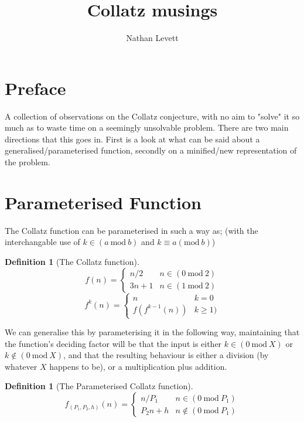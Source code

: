 \documentclass[12pt,a4paper]{amsart}
\author{Nathan Levett}
\title{Collatz musings}
\numberwithin{equation}{section}
\theoremstyle{plain}
\theoremstyle{definition}
\newtheorem{Def}[Th]{Definition}
\begin{document}
	
\tableofcontents

\section{Preface}

A collection of observations on the Collatz conjecture, with no aim to "solve" it so much as to waste time on a seemingly unsolvable problem. There are two main directions that this goes in. First is a look at what can be said about a generalised/parameterised function, secondly on a minified/new representation of the problem.

\section{Parameterised Function}

The Collatz function can be parameterised in such a way as; (with the interchangable use of $k \in \left ( a\:\mathrm{mod}\:b \right )$ and $k \equiv a \left ( \mathrm{mod}\:b \right )$) 

\begin{Def}[The Collatz function]
\begin{equation}
f\left ( n \right )=\left\{\begin{matrix}
n/2  & n \in \left ( 0\:\mathrm{mod}\:2 \right ) \\ 
3n+1 & n \in \left ( 1\:\mathrm{mod}\:2 \right )
\end{matrix}\right.
\end{equation}
\begin{equation}
f^{k}\left ( n \right )=\left\{\begin{matrix}
n & k=0 \\ 
f\left ( f^{k-1}\left ( n \right ) \right ) & k \geq 1 )
\end{matrix}\right.
\end{equation}
\end{Def}

We can generalise this by parameterising it in the following way, maintaining that the function's deciding factor will be that the input is either $k \in \left ( 0\:\mathrm{mod}\:X \right )$ or $k \notin \left ( 0\:\mathrm{mod}\:X \right )$, and that the resulting behaviour is either a division (by whatever $X$ happens to be), or a multiplication plus addition.

\begin{Def}[The Parameterised Collatz function]
\begin{equation}
f_{\left (P_{1},P_{2},h\right )}\left ( n \right )=\left\{\begin{matrix}
n/P_{1}  & n \in \left ( 0\:\mathrm{mod}\:P_{1} \right ) \\ 
P_{2}n+h & n \notin \left ( 0\:\mathrm{mod}\:P_{1} \right )
\end{matrix}\right.
\end{equation}
\end{Def}
\end{document}
